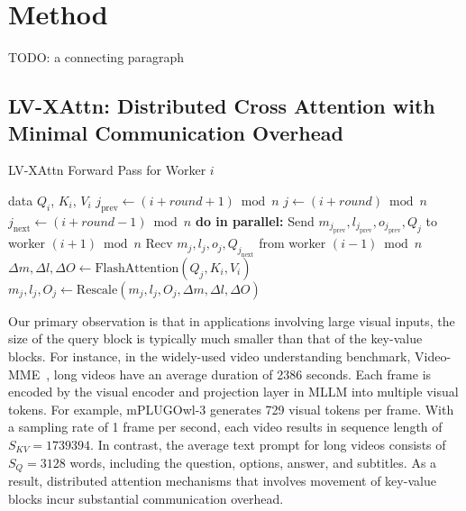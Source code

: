 \section{Method}
TODO: a connecting paragraph
\subsection{LV-XAttn: Distributed Cross Attention with Minimal Communication Overhead}
\begin{algorithm}[tb]
   \caption{LV-XAttn Forward Pass for Worker $i$}
   \label{alg:lv-xattn}
    \begin{algorithmic}
        data $Q_i$, $K_i$, $V_i$
            \STATE $j_{\text{prev}} \gets (i+round+1) \bmod n$
            \STATE $j \gets (i+round) \bmod n$
            \STATE $j_{\text{next}} \gets (i+round-1) \bmod n$
            \STATE \textbf{do in parallel:}
            \STATE \hspace{1em} Send $m_{j_{\text{prev}}}, l_{j_{\text{prev}}}, o_{j_{\text{prev}}}, Q_{j}$ to worker $(i+1) \bmod n$
            \STATE \hspace{1em} Recv $m_{j}, l_{j}, o_{j}, Q_{j_{\text{next}}}$ from worker $(i-1) \bmod n$
            \STATE \hspace{1em} $\Delta m, \Delta l, \Delta O \gets \text{FlashAttention}(Q_{j}, K_i, V_i)$
            \STATE $m_{j}, l_{j}, O_{j} \gets \text{Rescale}(m_{j}, l_{j}, O_{j}, \Delta m, \Delta l, \Delta O)$
       \ENDFOR
    \end{algorithmic}
\end{algorithm}
Our primary observation is that in applications involving large visual inputs, the size of the query block is typically much smaller than that of the key-value blocks. For instance, in the widely-used video understanding benchmark, Video-MME~\cite{fu2024video-mme}, long videos have an average duration of 2386 seconds. Each frame is encoded by the visual encoder and projection layer in MLLM into multiple visual tokens. For example, mPLUGOwl-3 generates 729 visual tokens per frame. With a sampling rate of 1 frame per second, each video results in sequence length of $S_{KV} = 1739394$. In contrast, the average text prompt for long videos consists of $S_Q = 3128$ words, including the question, options, answer, and subtitles. As a result, distributed attention mechanisms that involves movement of key-value blocks incur substantial communication overhead.

